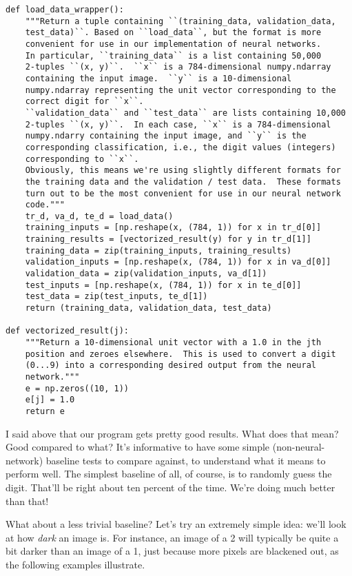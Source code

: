 \begin{fullwidth}
\begin{lstlisting}
def load_data_wrapper():
    """Return a tuple containing ``(training_data, validation_data,
    test_data)``. Based on ``load_data``, but the format is more
    convenient for use in our implementation of neural networks.
    In particular, ``training_data`` is a list containing 50,000
    2-tuples ``(x, y)``.  ``x`` is a 784-dimensional numpy.ndarray
    containing the input image.  ``y`` is a 10-dimensional
    numpy.ndarray representing the unit vector corresponding to the
    correct digit for ``x``.
    ``validation_data`` and ``test_data`` are lists containing 10,000
    2-tuples ``(x, y)``.  In each case, ``x`` is a 784-dimensional
    numpy.ndarry containing the input image, and ``y`` is the
    corresponding classification, i.e., the digit values (integers)
    corresponding to ``x``.
    Obviously, this means we're using slightly different formats for
    the training data and the validation / test data.  These formats
    turn out to be the most convenient for use in our neural network
    code."""
    tr_d, va_d, te_d = load_data()
    training_inputs = [np.reshape(x, (784, 1)) for x in tr_d[0]]
    training_results = [vectorized_result(y) for y in tr_d[1]]
    training_data = zip(training_inputs, training_results)
    validation_inputs = [np.reshape(x, (784, 1)) for x in va_d[0]]
    validation_data = zip(validation_inputs, va_d[1])
    test_inputs = [np.reshape(x, (784, 1)) for x in te_d[0]]
    test_data = zip(test_inputs, te_d[1])
    return (training_data, validation_data, test_data)

def vectorized_result(j):
    """Return a 10-dimensional unit vector with a 1.0 in the jth
    position and zeroes elsewhere.  This is used to convert a digit
    (0...9) into a corresponding desired output from the neural
    network."""
    e = np.zeros((10, 1))
    e[j] = 1.0
    return e
\end{lstlisting}
\end{fullwidth}

I said above that our program gets pretty good results. What does that mean? Good compared to what? It's informative to have some simple (non-neural-network) baseline tests to compare against, to understand what it means to perform well. The simplest baseline of all, of course, is to randomly guess the digit. That'll be right about ten percent of the time. We're doing much better than that!

What about a less trivial baseline? Let's try an extremely simple idea: we'll look at how \textit{dark} an image is. For instance, an image of a 2 will typically be quite a bit darker than an image of a 1, just because more pixels are blackened out, as the following examples illustrate.


